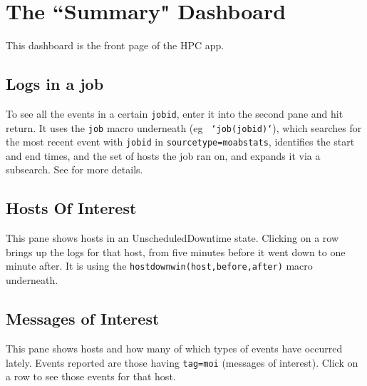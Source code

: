 \section{The ``Summary" Dashboard}
This dashboard is the front page of the HPC app.  

\subsection{Logs in a job}
To see all the events in a certain {\tt jobid}, enter it into the second pane
and hit return.  It uses the {\tt job} macro underneath (eg {\tt
`job(jobid)`}), which searches for the most recent event with {\tt jobid}
in {\tt sourcetype=moabstats}, identifies the start and end times, and the 
set of hosts the job ran on, and expands it via a subsearch.  See 
\cite{stearley-slaml10} for more details.

\subsection{Hosts Of Interest}
This pane shows hosts in an UnscheduledDowntime state.  Clicking on a row
brings up the logs for that host, from five minutes before it went down to 
one minute after.  It is using the {\tt hostdownwin(host,before,after)} macro
underneath.

\subsection{Messages of Interest}
This pane shows hosts and how many of which types of events have occurred lately.
Events reported are those having {\tt tag=moi} (messages of interest).  Click
on a row to see those events for that host.

